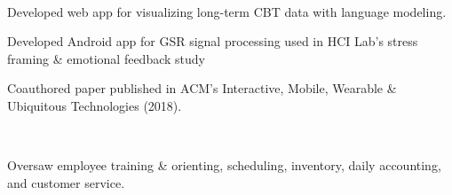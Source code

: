 \documentclass[]{hieudo-build}
\begin{document}
\begin{minipage}[t]{0.63\textwidth}
 \\
\begin{tightemize}
\item Developed web app for visualizing long-term CBT data with language modeling. \\
\smallskip
{}
\end{tightemize}
\smallskip

\begin{tightemize}
\item Developed Android app for GSR signal processing used in HCI Lab's stress framing \& emotional feedback study \\
\smallskip
{}
\item Coauthored paper published in ACM's
Interactive, Mobile, Wearable \& Ubiquitous Technologies (2018). \\
\end{tightemize}

\sectionsep


 \\
\begin{tightemize}
\item Oversaw employee training \& orienting, scheduling, inventory, daily accounting, and customer service.
\end{tightemize}
\sectionsep

%
%
\end{minipage} 
\end{document}
